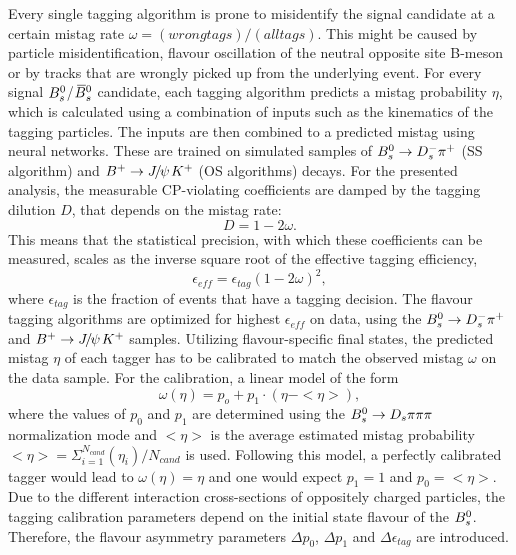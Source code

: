 Every single tagging algorithm is prone to misidentify the signal candidate at a certain mistag rate $\omega = (wrong tags)/ (all tags)$. 
This might be caused by particle misidentification, flavour oscillation of the neutral opposite site B-meson or by tracks that are wrongly picked up from the underlying event. 
For every signal ${{B}^0_{s}}$/${{\kern 0.18em\overline{\kern -0.18em B}{}}{}^0_{s}}$ candidate, each tagging algorithm predicts a mistag probability $\eta$, which is calculated using a combination of inputs such as the kinematics of the tagging particles. 
The inputs are then combined to a predicted mistag using neural networks. These are trained on simulated samples of ${{B}^0_{s}}\rightarrow{\ensuremath{{D}^-_{s}}}{\ensuremath{{\pi}^+}}$ (SS algorithm) and ${{B}^+}\rightarrow{\ensuremath{{J\mskip -3mu/\mskip -2mu\psi\mskip 2mu}}}{\ensuremath{{K}^+}}$ (OS algorithms) decays.
For the presented analysis, the measurable CP-violating coefficients are damped by the tagging dilution $D$, that depends on the mistag rate:
\begin{equation}
\label{eq: taggingDilution}
D = 1 - 2\omega.
\end{equation}
This means that the statistical precision, with which these coefficients can be measured, scales as the inverse square root of the effective tagging efficiency,
\begin{equation}
\label{eq: taggingEfficiency}
\epsilon_{eff} = \epsilon_{tag}(1 - 2\omega)^{2},
\end{equation}
where $\epsilon_{tag}$ is the fraction of events that have a tagging decision. 
The flavour tagging algorithms are optimized for highest $\epsilon_{eff}$ on data, using the ${{B}^0_{s}}\rightarrow{\ensuremath{{D}^-_{s}}}{\ensuremath{{\pi}^+}}$ and ${{B}^+}\rightarrow{\ensuremath{{J\mskip -3mu/\mskip -2mu\psi\mskip 2mu}}}{\ensuremath{{K}^+}}$ samples. \newline
Utilizing flavour-specific final states, the predicted mistag $\eta$ of each tagger has to be calibrated to match the observed mistag $\omega$ on the data sample. 
For the calibration, a linear model of the form
\begin{equation}
\label{eq: mistagCalibration}
\omega(\eta) = p_{o} + p_{1} \cdot (\eta - < \eta >), 
\end{equation}  
where the values of $p_{0}$ and $p_{1}$ are determined using the ${{B}^0_{s}}\rightarrow{\ensuremath{{D}_{s}}}{\ensuremath{\pi}}{\ensuremath{\pi}}{\ensuremath{\pi}}$ normalization mode and $<\eta>$ is the average estimated mistag probability $<\eta> = \Sigma_{i=1}^{N_{cand}}(\eta_{i}) / N_{cand}$ is used.
Following this model, a perfectly calibrated tagger would lead to $\omega(\eta) = \eta$ and one would expect $p_{1} = 1$ and $p_{0} = <\eta>$.
Due to the different interaction cross-sections of oppositely charged particles, the tagging calibration parameters depend on the initial state flavour of the ${{B}^0_{s}}$. 
Therefore, the flavour asymmetry parameters $\Delta p_{0}$, $\Delta p_{1}$ and $\Delta\epsilon_{tag}$ are introduced. 
